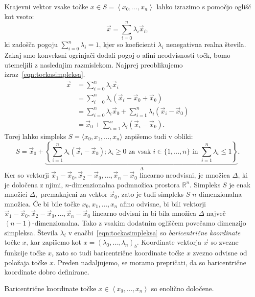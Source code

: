 \documentclass[mat1]{fmfdelo}
\newcommand{\R}{\mathbb R}
\newcommand{\0}{0}
\begin{document}
Krajevni vektor vsake točke $x \in S = \left < x_0, \dots, x_n \right >$ lahko izrazimo s pomočjo oglišč kot vsoto:
\begin{equation}\label{eqn:tockasimpleksa}
\vec{x} = \sum\limits_{i=0}^n \lambda_i \vec{x}_i,
\end{equation}
ki zadošča pogoju $\sum\limits_{i=0}^n \lambda_i = 1$, kjer so koeficienti $\lambda_i$ nenegativna realna števila. Zakaj smo konveksni ogrinjači dodali pogoj o afini neodvisnosti točk, bomo utemeljili z naslednjim razmislekom. Najprej preoblikujemo izraz~\eqref{eqn:tockasimpleksa}. 
\begin{align*}
\vec{x} &= \sum\limits_{i=0}^n \lambda_i \vec{x}_i \\
&= \sum\limits_{i=0}^n \lambda_i (\vec{x}_i - \vec{x}_0 + \vec{x}_0) \\
&= \sum\limits_{i=0}^n \lambda_i \vec{x}_0 + \sum\limits_{i=1}^n \lambda_i (\vec{x}_i - \vec{x}_0) \\
&= \vec{x}_0 + \sum\limits_{i=1}^n \lambda_i (\vec{x}_i - \vec{x}_0).
\end{align*}
Torej lahko simpleks $S = \langle x_0, x_1, \dots, x_n \rangle$ zapišemo tudi v obliki:
$$S = \vec{x}_0 + \underbrace{\left \{ \sum\limits_{i=1}^n \lambda_i (\vec{x}_i - \vec{x}_0); \lambda_i \geq 0 \text{ za vsak } i \in \{1, \dots, n \} \text{ in } \sum\limits_{i=1}^n \lambda_i \leq 1  \right \}}_{\Delta}.$$
Ker so vektorji $\vec{x}_1 - \vec{x}_0, \vec{x}_2 - \vec{x}_0, \dots, \vec{x}_n - \vec{x}_0$ linearno neodvisni, je množica $\Delta$, ki je določena z njimi, $n$-dimenzionalna podmnožica prostora $\R^n$. Simpleks $S$ je enak množici $\Delta,$ premaknjeni za vektor $\vec{x}_0$, zato je tudi simpleks $S$ $n$-dimenzionalna množica. Če bi bile točke $x_0, x_1, \dots, x_n$ afino odvisne, bi bili vektorji $\vec{x}_1 - \vec{x}_0, \vec{x}_2 - \vec{x}_0, \dots, \vec{x}_n - \vec{x}_0$ linearno odvisni in bi bila množica $\Delta$ največ $(n-1)$-dimenzionalna. Tako z vsakim dodatnim ogliščem povečamo dimenzijo simpleksa.
Števila $\lambda_i$ v enačbi~\eqref{eqn:tockasimpleksa} so \emph{baricentrične koordinate} točke $x$, kar zapišemo kot $x = (\lambda_0, \dots, \lambda_n)_b$. Koordinate vektorja $\vec{x}$ so zvezne funkcije točke $x$, zato so tudi baricentrične koordinate točke $x$ zvezno odvisne od položaja točke $x$. Preden nadaljujemo, se moramo prepričati, da so baricentrične koordinate dobro definirane.
\begin{trditev}\label{trd:zveznost-baricentra}
Baricentrične koordinate točke $x \in \left <x_0, \dots, x_n \right >$ so enolično določene.
\end{trditev}
\end{document}
